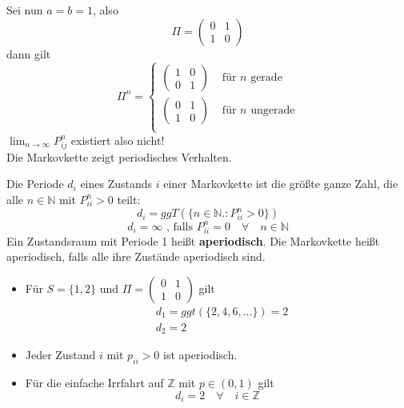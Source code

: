 \documentclass[a4paper,12pt]{article}
\begin{document}
\begin{tcolorbox}[breakable, colframe=blue, colback=white, title=Beispiel 11 (Fortsetzung)]
Sei nun $a = b = 1$, also 
$$
\Pi = \begin{pmatrix} 
0 & 1 \\ 
1 & 0
\end{pmatrix}
$$
dann gilt
$$
\Pi^n =
\begin{cases}
\begin{pmatrix}1 & 0 \\ 0 & 1 \end{pmatrix} & \text{ für $n$ gerade} \\
\begin{pmatrix}0 & 1 \\ 1 & 0 \end{pmatrix} & \text{ für $n$ ungerade} \\
\end{cases}
$$
$\lim_{n \to \infty}P_{ij}^n$ existiert also nicht!\\
Die Markovkette zeigt periodisches Verhalten. 
\end{tcolorbox}


Die Periode $d_i$ eines Zustands $i$ einer Markovkette ist 
die größte ganze Zahl, die alle $n \in \mathbb{N}$ mit $P_{ii}^n > 0$ teilt:
$$
d_i = ggT\left(\{n \in \mathbb{N}.: P_{ii}^n >0\}\right)
$$
$$
d_i = \infty \text{ , falls } P_{ii}^n = 0 \quad \forall \quad n \in \mathbb{N}
$$
Ein Zustandsraum mit Periode 1 heißt \textbf{aperiodisch}. Die Markovkette heißt aperiodisch,
falls alle ihre Zustände aperiodisch sind.


\begin{tcolorbox}[breakable, colframe=blue, colback=white, title=Beispiel 12]
\begin{itemize}

\item Für $S = \{1,2\}$ und $\Pi = \begin{pmatrix}  0 & 1 \\ 1 & 0 \end{pmatrix}$ gilt
\begin{align*}
&d_1 = ggt\left(\{2,4,6,...\}\right) = 2 \\
&d_2 = 2
\end{align*}
\item Jeder Zustand $i$ mit $p_{ii} > 0$ ist aperiodisch.
\item Für die einfache Irrfahrt auf $\mathbb{Z}$ mit $p \in (0,1)$ gilt
$$
d_i = 2 \quad \forall \quad i \in \mathbb{Z}
$$
\end{itemize}
\end{tcolorbox}
\end{document}
